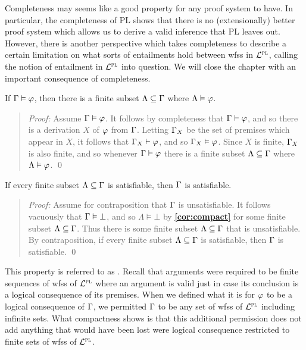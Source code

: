 Completeness may seems like a good property for any proof system to have.
In particular, the completeness of PL shows that there is no (extensionally) better proof system which allows us to derive a valid inference that PL leaves out.
However, there is another perspective which takes completeness to describe a certain limitation on what sorts of entailments hold between wfss in $\mathcal{L}^{\textsc{pl}}$, calling the notion of entailment in $\mathcal{L}^{\textsc{pl}}$ into question.
We will close the chapter with an important consequence of completeness.

\begin{Cthm} \label{cor:compact}
  If $\Gamma\vDash\varphi$, then there is a finite subset $\Lambda\subseteq\Gamma$ where $\Lambda\vDash\varphi$.
\end{Cthm} \vspace{-.2in}

\begin{quote} 
  \textit{Proof:} 
  Assume $\Gamma\vDash\varphi$.  
  It follows by completeness that $\Gamma\vdash\varphi$, and so there is a derivation $X$ of $\varphi$ from $\Gamma$.
  Letting $\Gamma_X$ be the set of premises which appear in $X$, it follows that $\Gamma_X\vdash\varphi$, and so $\Gamma_X\vDash\varphi$.
  Since $X$ is finite, $\Gamma_X$ is also finite, and so whenever $\Gamma\vDash\varphi$ there is a finite subset $\Lambda\subseteq\Gamma$ where $\Lambda\vDash\varphi$.
  \qed
\end{quote}



\begin{Cthm}[Compactness] \label{cor:compact2}
  If every finite subset $\Lambda\subseteq\Gamma$ is satisfiable, then $\Gamma$ is satisfiable.
\end{Cthm} \vspace{-.2in}

\begin{quote} 
  \textit{Proof:} 
  Assume for contraposition that $\Gamma$ is unsatisfiable. 
  It follows vacuously that $\Gamma\vDash\bot$, and so $\Lambda\vDash\bot$ by \textbf{\ref{cor:compact}} for some finite subset $\Lambda\subseteq\Gamma$.
  Thus there is some finite subset $\Lambda\subseteq\Gamma$ that is unsatisfiable. 
  By contraposition, if every finite subset $\Lambda\subseteq\Gamma$ is satisfiable, then $\Gamma$ is satisfiable. 
  \qed
\end{quote}


This property is referred to as .
Recall that arguments were required to be finite sequences of wfss of $\mathcal{L}^{\textsc{pl}}$ where an argument is valid just in case its conclusion is a logical consequence of its premises.
When we defined what it is for $\varphi$ to be a logical consequence of $\Gamma$, we permitted $\Gamma$ to be any set of wfss of $\mathcal{L}^{\textsc{pl}}$ including infinite sets. 
What compactness shows is that this additional permission does not add anything that would have been lost were logical consequence restricted to finite sets of wfss of $\mathcal{L}^{\textsc{pl}}$.

